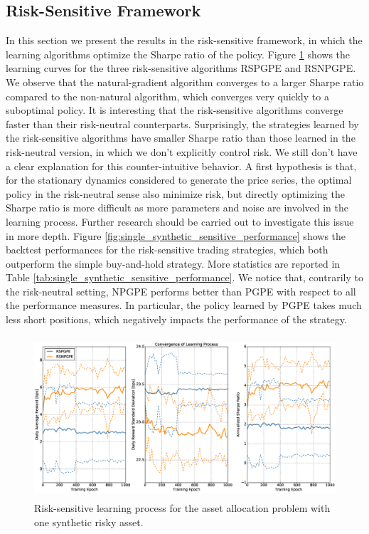 \subsection{Risk-Sensitive Framework}
In this section we present the results in the risk-sensitive framework, in which the learning algorithms optimize the Sharpe ratio of the policy. Figure \ref{fig:single_synthetic_sensitive_convergence} shows the learning curves for the three risk-sensitive algorithms \gls{RSPGPE} and \gls{RSNPGPE}. We observe that the natural-gradient algorithm converges to a larger Sharpe ratio compared to the non-natural algorithm, which converges very quickly to a suboptimal policy. It is interesting that the risk-sensitive algorithms converge faster than their risk-neutral counterparts. Surprisingly, the strategies learned by the risk-sensitive algorithms have smaller Sharpe ratio than those learned in the risk-neutral version, in which we don't explicitly control risk. We still don't have a clear explanation for this counter-intuitive behavior. A first hypothesis is that, for the stationary dynamics considered to generate the price series, the optimal policy in the risk-neutral sense also minimize risk, but directly optimizing the Sharpe ratio is more difficult as more parameters and noise are involved in the learning process. Further research should be carried out to investigate this issue in more depth. Figure \ref{fig:single_synthetic_sensitive_performance} shows the backtest performances for the risk-sensitive trading strategies, which both outperform the simple buy-and-hold strategy. More statistics are reported in Table \ref{tab:single_synthetic_sensitive_performance}. We notice that, contrarily to the risk-neutral setting, \gls{NPGPE} performs better than \gls{PGPE} with respect to all the performance measures. In particular, the policy learned by \gls{PGPE} takes much less short positions, which negatively impacts the performance of the strategy.

\begin{figure}[t!]
	\centering
	\includegraphics[height=6cm,width=1.0\textwidth]{Images/8_4_single_synthetic_sensitive_convergence}
	\caption[Risk-sensitive learning process for one synthetic risky asset]{Risk-sensitive learning process for the asset allocation problem with one synthetic risky asset.}
	\label{fig:single_synthetic_sensitive_convergence}
\end{figure}

